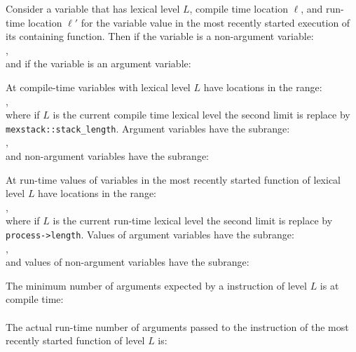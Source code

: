 \documentclass[12pt]{article}
\begin{document}
\begin{indpar}
Consider a variable that has lexical level $L$,
compile time location $\ell$,
and run-time location $\ell'$ for the variable value in the most recently
started execution of its containing function.
Then if the variable is a non-argument variable:\label{FP} \\
\hspace*{1in}{\tt $\ell$ - mexstack::fp[$L$] == $\ell'$ - process->fp[$L$]}, \\
and if the variable is an argument variable:\label{AP} \\
\hspace*{1in}{\tt $\ell$ - mexstack::ap[$L$] == $\ell'$ - process->ap[$L$]}

At compile-time variables with lexical level $L$ have locations in
the range:\label{LP} \\
\hspace*{1in}{\tt [ mexstack::ap[$L$], mexstack::ap[$L$+1] )}, \\
where if $L$ is the current compile time lexical level the second
limit is replace by {\tt mexstack::stack\_length}.
Argument variables have the subrange: \\
\hspace*{1in}{\tt [ mexstack::ap[$L$], mexstack::fp[$L$] )}, \\
and non-argument variables have the subrange: \\
\hspace*{1in}{\tt [ mexstack::fp[$L$], mexstack::ap[$L$+1] )}

At run-time values of variables in the most recently started
function of lexical level $L$ have locations in
the range: \\
\hspace*{1in}{\tt [ process->ap[$L$], process->ap[$L$+1] )}, \\
where if $L$ is the current run-time lexical level the second
limit is replace by {\tt process->\EOL length}.
Values of argument variables have the subrange: \\
\hspace*{1in}{\tt [ process->ap[$L$], process->fp[$L$] )}, \\
and values of non-argument variables have the subrange: \\
\hspace*{1in}{\tt [ process->fp[$L$], process->ap[$L$+1] )}

The minimum number of arguments expected by a  instruction
of level $L$
is at compile time: \\
\hspace*{1in}{\tt mexstack::ap[$L$] - mexstack::fp[$L$]} \\
The actual run-time  number of arguments passed to the  instruction
of the most recently started function of level $L$
is: \\
\hspace*{1in}{\tt process->ap[$L$] - process->fp[$L$]}


\end{indpar}
\end{document}
